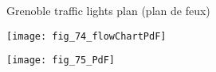 \begin{frame}{Grenoble traffic lights plan (plan de feux)}
    \begin{center}
        \centering
        \texttt{[image: fig\_74\_flowChartPdF]}
    \end{center}
    \begin{center}
        \texttt{[image: fig\_75\_PdF]}
    \end{center}
\end{frame}
